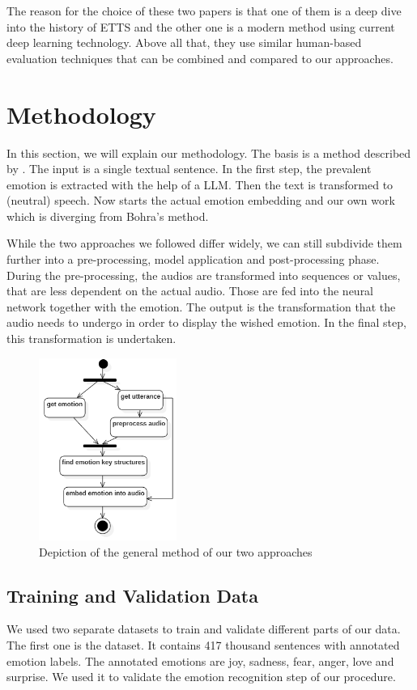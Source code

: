 \documentclass[11pt]{article}
\begin{document}

The reason for the choice of these two papers is that one of them is a deep dive into the history of ETTS and the other one is a modern method using current deep learning technology. Above all that, they use similar human-based evaluation techniques that can be combined and compared to our approaches.

\section{Methodology}
\label{methodology}
In this section, we will explain our methodology. The basis is a method described by \cite{bohra_smart_2022}. The input is a single textual sentence. In the first step, the prevalent emotion is extracted with the help of a LLM. Then the text is transformed to (neutral) speech. Now starts the actual emotion embedding and our own work which is diverging from Bohra's method.

While the two approaches we followed differ widely, we can still subdivide them further into a pre-processing, model application and post-processing phase. During the pre-processing, the audios are transformed into sequences or values, that are less dependent on the actual audio. Those are fed into the neural network together with the emotion. The output is the transformation that the audio needs to undergo in order to display the wished emotion. In the final step, this transformation is undertaken.

\begin{figure}[h]
 \centering
\includegraphics[width=0.4\textwidth]{"Bilder/Prozess.PNG"}
\caption{Depiction of the general method of our two approaches}
\label{Ablauf}
\end{figure}

\subsection{Training and Validation Data}
We used two separate datasets to train and validate different parts of our data.
The first one is the \cite{saravia-etal-2018-carer} dataset. It contains 417 thousand sentences with annotated emotion labels. The annotated emotions are joy, sadness, fear, anger, love and surprise. We used it to validate the emotion recognition step of our procedure.
\end{document}
